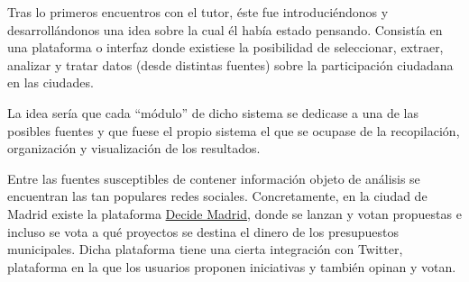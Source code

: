 



Tras lo primeros encuentros con el tutor, éste fue introduciéndonos y desarrollándonos una idea sobre la cual él había estado pensando. Consistía en una plataforma o interfaz donde existiese la posibilidad de seleccionar, extraer, analizar y tratar datos (desde distintas fuentes) sobre la participación ciudadana en las ciudades.

La idea sería que cada ``módulo'' de dicho sistema se dedicase a una de las posibles fuentes y que fuese el propio sistema el que se ocupase de la recopilación, organización y visualización de los resultados.

Entre las fuentes susceptibles de contener información objeto de análisis se encuentran las tan populares redes sociales. Concretamente, en la ciudad de Madrid existe la plataforma \href{https://decide.madrid.es/}{Decide Madrid}, donde se lanzan y votan propuestas e incluso se vota a qué proyectos se destina el dinero de los presupuestos municipales. Dicha plataforma tiene una cierta integración con Twitter, plataforma en la que los usuarios proponen iniciativas y también opinan y votan.\clearpage

